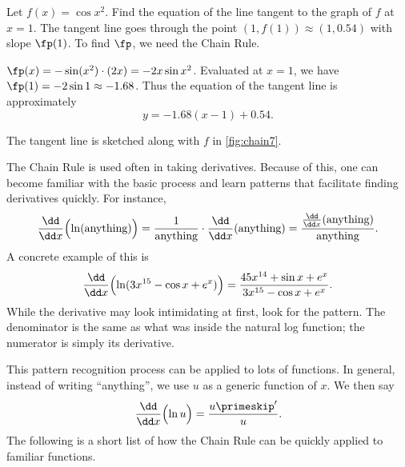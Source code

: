 \begin{example}\label{ex_chain7}%
Let $f(x) = \cos x^2$. Find the equation of the line tangent to the graph of $f$ at $x=1$.
\solution
The tangent line goes through the point $(1,f(1)) \approx (1,0.54)$ with slope $\fp(1)$. To find $\fp$, we need the Chain Rule.

$\fp(x) = -\sin(x^2) \cdot(2x) = -2x\sin x^2$. Evaluated at $x=1$, we have $\fp(1) = -2\sin 1\approx -1.68$. Thus the equation of the tangent line is approximately
%
%
\[y = -1.68(x-1)+0.54.\]

The tangent line is sketched along with $f$ in \autoref{fig:chain7}.
\end{example}

The Chain Rule is used often in taking derivatives. Because of this, one can become familiar with the basic process and learn  patterns that facilitate finding derivatives quickly. For instance,
\[
 \frac{\dd}{\dd x}\Bigl(\ln (\text{anything})\Bigr)
 = \frac{1}{\text{anything}}\cdot\frac{\dd}{\dd x}(\text{anything})
 = \frac{\frac{\dd}{\dd x}(\text{anything})}{\text{anything}}.
\]
A concrete example of this is
\[
\frac{\dd}{\dd x}\Bigl(\ln(3x^{15}-\cos x+e^x)\Bigr)
= \frac{45x^{14}+\sin x+e^x}{3x^{15}-\cos x+e^x}.
\]
While the derivative may  look intimidating at first, look for the pattern. The denominator is the same as what was inside the natural log function; the  numerator is simply its derivative.

This pattern recognition process can be applied to lots of functions. In general, instead of writing ``anything'', we use $u$ as a generic function of $x$. We then say \[\frac{\dd}{\dd x}\Bigl(\ln u\Bigr) = \frac{u\primeskip'}{u}.\]
The following is a short list of how the Chain Rule can be quickly applied to familiar functions.

